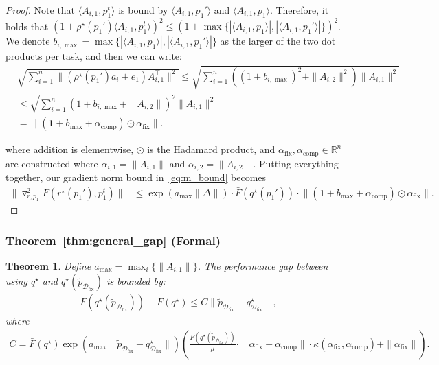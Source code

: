 \documentclass[table]{ai2style/ai2}
\newtheorem{theorem}{Theorem}
\newcommand{\R}[0]{\mathbb{R}}
\newcommand{\Dfix}[0]{\mathcal{D}_{\text{fix}}}
\newcommand{\alphafix}[0]{\alpha_{\text{fix}}}
\newcommand{\alphacomp}[0]{\alpha_{\text{comp}}}
\begin{document}
\begin{proof}
Note that $\langle A_{i, 1}, p_1^t \rangle$ is bound by $\langle A_{i, 1}, p_1' \rangle$ and $\langle A_{i, 1}, p_1 \rangle$. Therefore, it holds that $(1 + \rho^\star(p_1') \langle A_{i, 1}, p_1^t \rangle)^2 \le (1 + \max\{ |\langle A_{i, 1}, p_1 \rangle|, |\langle A_{i, 1}, p_1' \rangle| \})^2$. We denote $b_{i, \max} = \max\{ |\langle A_{i, 1}, p_1 \rangle|, |\langle A_{i, 1}, p_1' \rangle| \}$ as the larger of the two dot products per task, and then we can write:
\begin{align*}
    &\sqrt{\sum_{i=1}^n \|(\rho^\star(p_1') a_i + e_1) A_{i, 1}^\top \|^2} \le \sqrt{\sum_{i = 1}^n ((1 + b_{i, \max})^2 + \|A_{i, 2} \|^2) \| A_{i, 1}\|^2} \\
    &\le \sqrt{\sum_{i = 1}^n (1 + b_{i, \max} + \|A_{i, 2} \|)^2 \| A_{i, 1}\|^2}  \\
    &= \big\| (\mathbf{1} + b_{\max} + \alphacomp) \odot \alphafix \big\|.
\end{align*}

where addition is elementwise, $\odot$ is the Hadamard product, and $\alphafix, \alphacomp \in \R^n$ are constructed where $\alpha_{i, 1} = \|A_{i, 1}\|$ and $\alpha_{i, 2} = \|A_{i, 2}\|$. Putting everything together, our gradient norm bound in~\eqref{eq:m_bound} becomes
\begin{align*}
    \|\triangledown^2_{r,p_1}F(r^\star(p_1'),p_1^t)\| &\le\exp( a_{\max} \| \Delta \| ) \cdot  \bar{F}(q^\star(p_1')) \cdot \big\| (\mathbf{1} + b_{\max} + \alphacomp) \odot \alphafix \big\|.
\end{align*}
\end{proof}

\subsubsection{Theorem~\ref{thm:general_gap} (Formal)}

\begin{theorem}\label{thm:gap_lipschitz}
Define $a_{\max} = \max_i \{\|A_{i, 1} \|\}$. The performance gap between using $q^\star$ and $q^\star(\tilde{p}_{\Dfix})$ is bounded by:
\begin{align*}
F(q^\star(\tilde p_{\Dfix}))-F(q^\star) \le C \|\tilde{p}_{\Dfix}-q^\star_{\Dfix}\|,
\end{align*}
where 
\begin{align*}
    C = \bar{F}(q^\star) \exp(a_{\max} \|\tilde{p}_{\Dfix}-q^\star_{\Dfix}\|) \left( \frac{\bar{F}(q^\star(\tilde{p}_{\Dfix}))}{\mu} \cdot \|\alphafix + \alphacomp \| \cdot \kappa(\alphafix, \alphacomp)   + \|\alphafix \| \right).
\end{align*}
\end{theorem}
\end{document}
